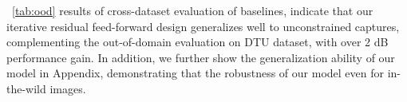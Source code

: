 ~\cref{tab:ood} results of cross-dataset evaluation of baselines, indicate that our iterative residual feed-forward design generalizes well to unconstrained captures, complementing the out-of-domain evaluation on DTU dataset, with over 2 dB performance gain. In addition, we further show the generalization ability of our model in Appendix, demonstrating that the robustness of our model even for in-the-wild images. 



